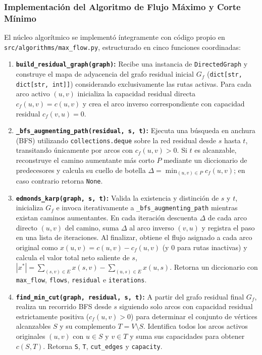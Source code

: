\documentclass[11pt,a4paper]{article}
\begin{document}
\subsubsection{Implementación del Algoritmo de Flujo Máximo y Corte Mínimo}
El núcleo algorítmico se implementó íntegramente con código propio en \texttt{src/algorithms/max\_flow.py}, estructurado en cinco funciones coordinadas:
\begin{enumerate}
    \item \textbf{\texttt{build\_residual\_graph(graph)}:} Recibe una instancia de \texttt{DirectedGraph} y construye el mapa de adyacencia del grafo residual inicial $G_f$ (\texttt{dict[str, dict[str, int]]}) considerando exclusivamente las rutas activas. Para cada arco activo $(u, v)$ inicializa la capacidad residual directa $c_f(u, v) = c(u, v)$ y crea el arco inverso correspondiente con capacidad residual $c_f(v, u) = 0$.
    \item \textbf{\texttt{\_bfs\_augmenting\_path(residual, s, t)}:} Ejecuta una búsqueda en anchura (BFS) utilizando \texttt{collections.deque} sobre la red residual desde $s$ hasta $t$, transitando únicamente por arcos con $c_f(u, v) > 0$. Si $t$ es alcanzable, reconstruye el camino aumentante más corto $P$ mediante un diccionario de predecesores y calcula su cuello de botella $\Delta = \min_{(u,v) \in P} c_f(u, v)$; en caso contrario retorna \texttt{None}.
    \item \textbf{\texttt{edmonds\_karp(graph, s, t)}:} Valida la existencia y distinción de $s$ y $t$, inicializa $G_f$ e invoca iterativamente a \texttt{\_bfs\_augmenting\_path} mientras existan caminos aumentantes. En cada iteración descuenta $\Delta$ de cada arco directo $(u, v)$ del camino, suma $\Delta$ al arco inverso $(v, u)$ y registra el paso en una lista de iteraciones. Al finalizar, obtiene el flujo asignado a cada arco original como $x(u, v) = c(u, v) - c_f(u, v)$ (y $0$ para rutas inactivas) y calcula el valor total neto saliente de $s$, $|x^*| = \sum_{(s,v)\in E} x(s, v) - \sum_{(u,s)\in E} x(u, s)$. Retorna un diccionario con \texttt{max\_flow}, \texttt{flows}, \texttt{residual} e \texttt{iterations}.
    \item \textbf{\texttt{find\_min\_cut(graph, residual, s, t)}:} A partir del grafo residual final $G_f$, realiza un recorrido BFS desde $s$ siguiendo solo arcos con capacidad residual estrictamente positiva ($c_f(u, v) > 0$) para determinar el conjunto de vértices alcanzables $S$ y su complemento $T = V \setminus S$. Identifica todos los arcos activos originales $(u, v)$ con $u \in S$ y $v \in T$ y suma sus capacidades para obtener $c(S, T)$. Retorna \texttt{S}, \texttt{T}, \texttt{cut\_edges} y \texttt{capacity}.

\end{enumerate}
\end{document}
